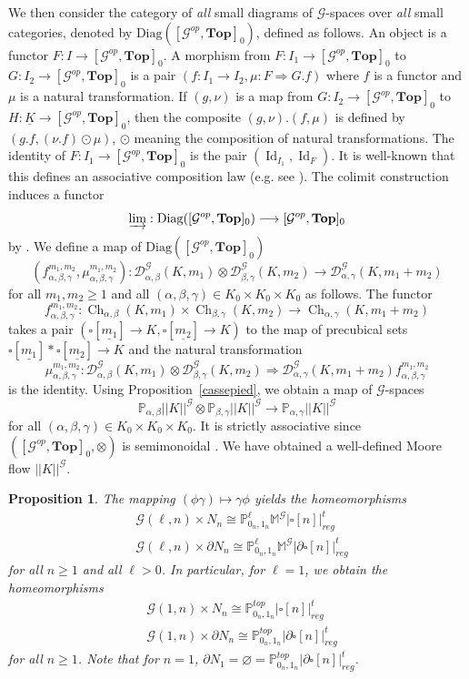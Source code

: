 \documentclass[a4paper,12pt]{amsart}
\newcommand{\D}{\mathcal{D}}
\newcommand{\de}{\partial}
\newcommand{\p}{\times}
\renewcommand{\P}{\mathbb{P}}
\newtheorem{prop}[thm]{Proposition}
\newcommand{\bp}{\begin{prop}}
\newcommand{\ep}{\end{prop}}
\theoremstyle{definition}
\renewcommand{\top}{{\mathbf{Top}}}
\newcommand{\iso}{\cong}
\newcommand{\ot}{\otimes}
\renewcommand{\geq}{\geqslant}
\newcommand{\moore}{{\mathbb{M}}}
\newcommand{\topdgr}{[\mathcal{G}^{op},\top]}
\DeclareMathOperator{\id}{Id}
\DeclareMathOperator{\Ch}{Ch}
\newcommand{\liminj}{\varinjlim}
\renewcommand{\P}{\mathbb{P}}
\begin{document}
We then consider the category of \textit{all} small diagrams of $\mathcal{G}$-spaces over \textit{all} small categories, denoted by $\mathrm{Diag}(\topdgr_0)$, defined as follows. An object is a functor $F:{I}\to \topdgr_0$. A morphism from $F:{I}_1\to \topdgr_0$ to $G:{I}_2\to \topdgr_0$ is a pair $(f:{I}_1\to {I}_2,\mu:F \Rightarrow G.f)$ where $f$ is a functor and $\mu$ is a natural transformation. If $(g,\nu)$ is a map from $G:{I}_2\to \topdgr_0$ to $H:\underline{K}\to \topdgr_0$, then the composite $(g,\nu).(f,\mu)$ is defined by $(g.f,(\nu.f)\odot\mu)$, $\odot$ meaning the composition of natural transformations. The identity of $F:{I}_1\to \topdgr_0$ is the pair $(\id_{{I}_1},\id_F)$. It is well-known that this defines an associative composition law (e.g. see \cite[Appendix~A]{leftproperflow}). The colimit construction induces a functor \[\liminj :\mathrm{Diag}(\topdgr_0) \longrightarrow \topdgr_0\] by \cite[Proposition~A.2]{leftproperflow}. We define a map of $\mathrm{Diag}(\topdgr_0)$
\[(f^{m_1,m_2}_{\alpha,\beta,\gamma},\mu^{m_1,m_2}_{\alpha,\beta,\gamma}):\D_{\alpha,\beta}^{\mathcal{G}}(K,m_1)\ot \D_{\beta,\gamma}^{\mathcal{G}}(K,m_2) \longrightarrow \D_{\alpha,\gamma}^{\mathcal{G}}(K,m_1+m_2)\]
for all $m_1,m_2\geq 1$ and all $(\alpha,\beta,\gamma)\in K_0\p K_0\p K_0$ as follows. The functor \[f^{m_1,m_2}_{\alpha,\beta,\gamma}:\Ch_{\alpha,\beta}(K,m_1)\p \Ch_{\beta,\gamma}(K,m_2) \to \Ch_{\alpha,\gamma}(K,m_1+m_2)\] takes a pair $(\square[\underline{m_1}]\to K,\square[\underline{m_2}] \to K)$ to the map of precubical sets $\square[\underline{m_1}]*\square[\underline{m_2}]\to K$ and the natural transformation
\[
\mu^{m_1,m_2}_{\alpha,\beta,\gamma}:\D_{\alpha,\beta}^{\mathcal{G}}(K,m_1)\ot \D_{\beta,\gamma}^{\mathcal{G}}(K,m_2)\Longrightarrow \D_{\alpha,\gamma}^{\mathcal{G}}(K,m_1+m_2) f^{m_1,m_2}_{\alpha,\beta,\gamma}
\] 
is the identity. Using Proposition~\ref{cassepied}, we obtain a map of $\mathcal{G}$-spaces \[\P_{\alpha,\beta} ||K||^{\mathcal{G}} \ot \P_{\beta,\gamma} ||K||^{\mathcal{G}} \longrightarrow \P_{\alpha,\gamma} ||K||^{\mathcal{G}}\] for all $(\alpha,\beta,\gamma)\in K_0\p K_0\p K_0$. It is strictly associative since $(\topdgr_0,\ot)$ is semimonoidal \cite[Proposition~5.11]{Moore1}. We have obtained a well-defined Moore flow $||K||^{\mathcal{G}}$. 



\bp \label{cp}
The mapping $(\phi\gamma)\mapsto \gamma\phi$ yields the homeomorphisms
\begin{align*}
	&\mathcal{G}(\ell,n)\p N_n \iso \P_{0_{n},1_{n}}^\ell\moore^{\mathcal{G}}|\square[n]|^t_{reg} \\
	&\mathcal{G}(\ell,n)\p \de N_n \iso \P_{0_{n},1_{n}}^\ell\moore^{\mathcal{G}}|\de\square[n]|^t_{reg}
\end{align*}
for all $n\geq 1$ and all $\ell>0$. In particular, for $\ell=1$, we obtain 
the homeomorphisms
\begin{align*}
	&\mathcal{G}(1,n)\p N_n \iso \P^{top}_{0_{n},1_{n}}|\square[n]|^t_{reg} \\
	&\mathcal{G}(1,n)\p \de N_n \iso \P^{top}_{0_{n},1_{n}}|\de\square[n]|^t_{reg}
\end{align*}
for all $n\geq 1$. Note that for $n=1$, $\de N_1=\varnothing= \P^{top}_{0_{n},1_{n}}|\de\square[n]|^t_{reg}$.
\ep
\end{document}
